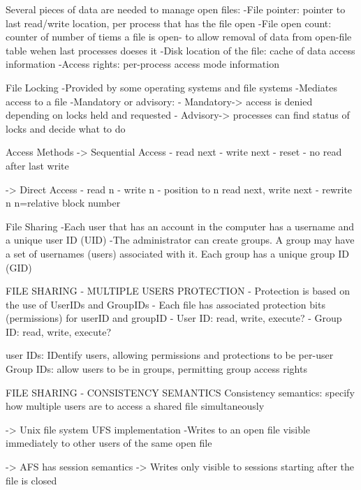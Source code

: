 Several pieces of data are needed to manage open files: 
-File pointer: pointer to last read/write location, per process that has 
               the file open 
-File open count: counter of number of tiems a file is open- to allow 
                removal of data from open-file table wehen last processes
                doeses it 
-Disk location of the file: cache of data access information 
-Access rights: per-process access mode information 


File Locking 
-Provided by some operating systems and file systems 
-Mediates access to a file 
-Mandatory or advisory: 
    - Mandatory-> access is denied depending on locks held and requested
    - Advisory-> processes can find status of locks and decide what to do 


                            Access Methods 
-> Sequential Access 
    - read next 
    - write next 
    - reset 
    - no read after last write 

-> Direct Access 
    - read n 
    - write n 
    - position to n read next, write next 
    - rewrite n 
n=relative block number 

                            File Sharing 
-Each user that has an account in the computer has a username and a unique 
user ID (UID)
-The administrator can create groups. A group may have a set of usernames 
(users) associated with it. Each group has a unique group ID (GID)


                    FILE SHARING - MULTIPLE USERS 
                            PROTECTION 
- Protection is based on the use of UserIDs and GroupIDs 
- Each file has associated protection bits (permissions) for userID and groupID 
        - User ID: read, write, execute? 
        - Group ID: read, write, execute?
        
user IDs: IDentify users, allowing permissions and protections to be per-user 
Group IDs: allow users to be in groups, permitting group access rights 


                    FILE SHARING - CONSISTENCY SEMANTICS 
Consistency semantics: specify how multiple users are to access a shared 
                       file simultaneously 


    -> Unix file system UFS implementation
        -Writes to an open file visible immediately to other users of the 
        same open file 

    -> AFS has session semantics 
        -> Writes only visible to sessions starting after the file is closed 



